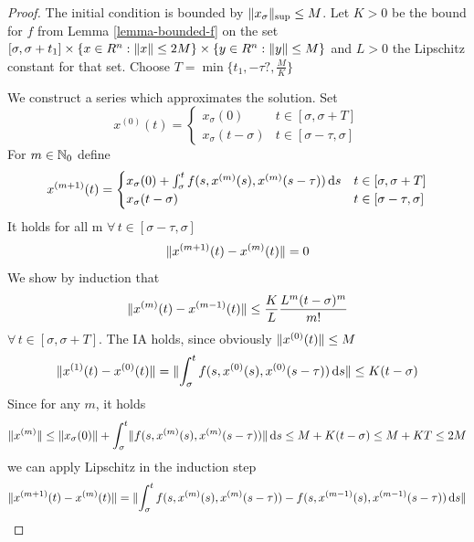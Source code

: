 \begin{proof}
    The initial condition is bounded by $\supnorm{x_\sigma}\leq M$.
    Let $K>0$ be the bound for $f$ from Lemma \ref{lemma-bounded-f} on the set $[\sigma,\sigma+t_1] \times \{x\in R^n: \nnorm{x}\leq 2M\}\times \{y\in R^n: \nnorm{y}\leq M\}$ and $L>0$ the Lipschitz constant for that set. Choose $T=\min\{t_1,-\tau ?, \frac{M}{K}\}$

    We construct a series which approximates the solution.
    Set
    \begin{equation}
        x^{(0)}(t)= \begin{cases}
            x_\sigma(0) & t\in [\sigma,\sigma+T]\\
            x_\sigma(t-\sigma) & t\in [\sigma-\tau,\sigma]
        \end{cases}
    \end{equation}
    For $m\in\N_0$ define
    \begin{equation}
        x^{(m+1)}(t)= \begin{cases}
            x_\sigma(0) + \int_\sigma^t f(s,x^{(m)}(s),x^{(m)}(s-\tau))\dx[s] & t\in [\sigma,\sigma+T]\\
            x_\sigma(t-\sigma) & t\in [\sigma-\tau,\sigma]
        \end{cases}
    \end{equation}
    It holds for all m $\forall\,t\in [\sigma-\tau,\sigma]$
    \begin{equation}
        \nnorm{x^{(m+1)}(t)-x^{(m)}(t)}=0
    \end{equation}
    We show by induction that
    \begin{equation}
        \nnorm{x^{(m)}(t)-x^{(m-1)}(t)} \leq \frac{K}{L}\frac{L^m (t-\sigma)^m}{m!}
    \end{equation}
    $\forall\,t\in [\sigma,\sigma+T]$.
    The IA holds, since obviously $\nnorm{x^{(0)}(t)}\leq M$
    \begin{equation}
        \nnorm{x^{(1)}(t)-x^{(0)}(t)} = \nnorm{\int_\sigma^t f(s,x^{(0)}(s),x^{(0)}(s-\tau))\dx[s]} \leq K(t-\sigma)
    \end{equation}
    Since for any $m$, it holds
    \begin{equation}
        \nnorm{x^{(m)}}\leq \nnorm{x_\sigma(0)} + \int_\sigma^t \nnorm{f(s,x^{(m)}(s),x^{(m)}(s-\tau))}\dx[s]
        \leq M + K(t-\sigma) \leq M+KT \leq 2M
    \end{equation}
    we can apply Lipschitz in the induction step
    \begin{align}
        \nnorm{x^{(m+1)}(t)-x^{(m)}(t)} &= \nnorm{\int_\sigma^t f(s,x^{(m)}(s),x^{(m)}(s-\tau)) - f(s,x^{(m-1)}(s),x^{(m-1)}(s-\tau))\dx[s]}\\

\end{align}
\end{proof}
